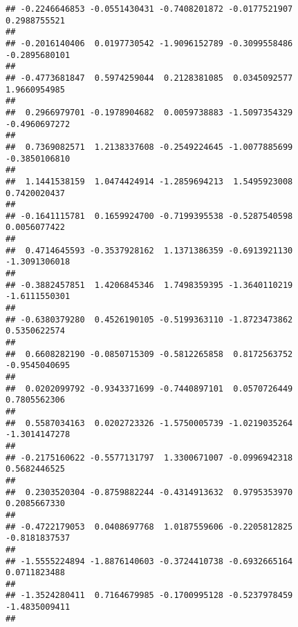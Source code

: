 \documentclass[]{article}
\begin{document}
\begin{verbatim}
## -0.2246646853 -0.0551430431 -0.7408201872 -0.0177521907  0.2988755521 
##                                                                       
## -0.2016140406  0.0197730542 -1.9096152789 -0.3099558486 -0.2895680101 
##                                                                       
## -0.4773681847  0.5974259044  0.2128381085  0.0345092577  1.9660954985 
##                                                                       
##  0.2966979701 -0.1978904682  0.0059738883 -1.5097354329 -0.4960697272 
##                                                                       
##  0.7369082571  1.2138337608 -0.2549224645 -1.0077885699 -0.3850106810 
##                                                                       
##  1.1441538159  1.0474424914 -1.2859694213  1.5495923008  0.7420020437 
##                                                                       
## -0.1641115781  0.1659924700 -0.7199395538 -0.5287540598  0.0056077422 
##                                                                       
##  0.4714645593 -0.3537928162  1.1371386359 -0.6913921130 -1.3091306018 
##                                                                       
## -0.3882457851  1.4206845346  1.7498359395 -1.3640110219 -1.6111550301 
##                                                                       
## -0.6380379280  0.4526190105 -0.5199363110 -1.8723473862  0.5350622574 
##                                                                       
##  0.6608282190 -0.0850715309 -0.5812265858  0.8172563752 -0.9545040695 
##                                                                       
##  0.0202099792 -0.9343371699 -0.7440897101  0.0570726449  0.7805562306 
##                                                                       
##  0.5587034163  0.0202723326 -1.5750005739 -1.0219035264 -1.3014147278 
##                                                                       
## -0.2175160622 -0.5577131797  1.3300671007 -0.0996942318  0.5682446525 
##                                                                       
##  0.2303520304 -0.8759882244 -0.4314913632  0.9795353970  0.2085667330 
##                                                                       
## -0.4722179053  0.0408697768  1.0187559606 -0.2205812825 -0.8181837537 
##                                                                       
## -1.5555224894 -1.8876140603 -0.3724410738 -0.6932665164  0.0711823488 
##                                                                       
## -1.3524280411  0.7164679985 -0.1700995128 -0.5237978459 -1.4835009411 
##                                                                       

\end{verbatim}
\end{document}
